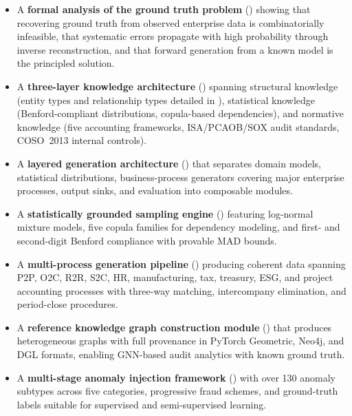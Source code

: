 \begin{itemize}
  \item A \textbf{formal analysis of the ground truth problem}
    () showing that recovering ground truth from
    observed enterprise data is combinatorially infeasible, that
    systematic errors propagate with high probability through inverse
    reconstruction, and that forward generation from a known model is
    the principled solution.

  \item A \textbf{three-layer knowledge architecture}
    () spanning structural
    knowledge (entity types and relationship types detailed in
    ), statistical knowledge (Benford-compliant
    distributions, copula-based dependencies), and normative knowledge
    (five accounting frameworks, ISA/PCAOB/SOX audit standards, COSO~2013
    internal controls).

  \item A \textbf{layered generation architecture}
    () that separates
    domain models, statistical distributions, business-process generators
    covering major enterprise processes, output sinks, and evaluation into
    composable modules.

  \item A \textbf{statistically grounded sampling engine}
    () featuring log-normal mixture
    models, five copula families for dependency modeling, and first- and
    second-digit Benford compliance with provable MAD bounds.

  \item A \textbf{multi-process generation pipeline}
    () producing coherent data spanning
    P2P, O2C, R2R, S2C, HR, manufacturing, tax, treasury, ESG, and
    project accounting processes with three-way matching, intercompany
    elimination, and period-close procedures.

  \item A \textbf{reference knowledge graph construction module}
    () that produces heterogeneous graphs with
    full provenance in PyTorch Geometric, Neo4j, and DGL formats, enabling
    GNN-based audit analytics with known ground truth.

  \item A \textbf{multi-stage anomaly injection framework}
    () with over 130 anomaly subtypes
    across five categories, progressive fraud schemes, and ground-truth
    labels suitable for supervised and semi-supervised learning.


\end{itemize}
